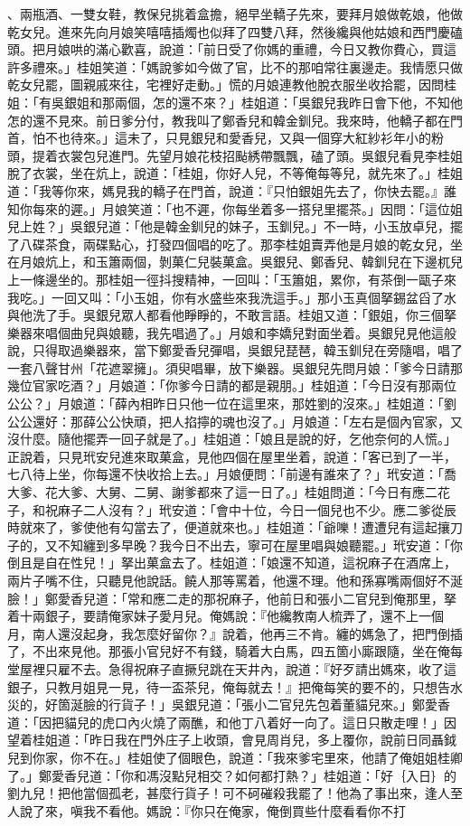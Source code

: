、兩瓶酒、一雙女鞋，教保兒挑着盒擔，絕早坐轎子先來，要拜月娘做乾娘，他做乾女兒。進來先向月娘笑嘻嘻插燭也似拜了四雙八拜，然後纔與他姑娘和西門慶磕頭。把月娘哄的滿心歡喜，說道：「前日受了你媽的重禮，今日又教你費心，買這許多禮來。」桂姐笑道：「媽說爹如今做了官，比不的那咱常往裏邊走。我情愿只做乾女兒罷，圖親戚來往，宅裡好走動。」慌的月娘連教他脫衣服坐收拾罷，因問桂姐：「有吳銀姐和那兩個，怎的還不來？」桂姐道：「吳銀兒我昨日會下他，不知他怎的還不見來。前日爹分付，教我叫了鄭香兒和韓金釧兒。我來時，他轎子都在門首，怕不也待來。」這未了，只見銀兒和愛香兒，又與一個穿大紅紗衫年小的粉頭，提着衣裳包兒進門。先望月娘花枝招颭綉帶飄飄，磕了頭。吳銀兒看見李桂姐脫了衣裳，坐在炕上，說道：「桂姐，你好人兒，不等俺每等兒，就先來了。」桂姐道：「我等你來，媽見我的轎子在門首，說道：『只怕銀姐先去了，你快去罷。』誰知你每來的遲。」月娘笑道：「也不遲，你每坐着多一搭兒里擺茶。」因問：「這位姐兒上姓？」吳銀兒道：「他是韓金釧兒的妹子，玉釧兒。」不一時，小玉放卓兒，擺了八碟茶食，兩碟點心，打發四個唱的吃了。那李桂姐賣弄他是月娘的乾女兒，坐在月娘炕上，和玉簫兩個，剝菓仁兒裝菓盒。吳銀兒、鄭香兒、韓釧兒在下邊杌兒上一條邊坐的。那桂姐一徑抖搜精神，一回叫：「玉簫姐，累你，有茶倒一甌子來我吃。」一回又叫：「小玉姐，你有水盛些來我洗這手。」那小玉真個拏錫盆舀了水與他洗了手。吳銀兒眾人都看他睜睜的，不敢言語。桂姐又道：「銀姐，你三個拏樂器來唱個曲兒與娘聽，我先唱過了。」月娘和李嬌兒對面坐着。吳銀兒見他這般說，只得取過樂器來，當下鄭愛香兒彈唱，吳銀兒琵琶，韓玉釧兒在旁隨唱，唱了一套八聲甘州「花遮翠擁」。須臾唱畢，放下樂器。吳銀兒先問月娘：「爹今日請那幾位官家吃酒？」月娘道：「你爹今日請的都是親朋。」桂姐道：「今日沒有那兩位公公？」月娘道：「薛內相昨日只他一位在這里來，那姓劉的沒來。」桂姐道：「劉公公還好：那薛公公快頑，把人掐擰的魂也沒了。」月娘道：「左右是個內官家，又沒什麼。隨他擺弄一回子就是了。」桂姐道：「娘且是說的好，乞他奈何的人慌。」正說着，只見玳安兒進來取菓盒，見他四個在屋里坐着，說道：「客已到了一半，七八待上坐，你每還不快收拾上去。」月娘便問：「前邊有誰來了？」玳安道：「喬大爹、花大爹、大舅、二舅、謝爹都來了這一日了。」桂姐問道：「今日有應二花子，和祝麻子二人沒有？」玳安道：「會中十位，今日一個兒也不少。應二爹從辰時就來了，爹使他有勾當去了，便道就來也。」桂姐道：「爺嚛！遭遭兒有這起攘刀子的，又不知纏到多早晚？我今日不出去，寧可在屋里唱與娘聽罷。」玳安道：「你倒且是自在性兒！」拏出菓盒去了。桂姐道：「娘還不知道，這祝麻子在酒席上，兩片子嘴不住，只聽見他說話。饒人那等罵着，他還不理。他和孫寡嘴兩個好不涎臉！」鄭愛香兒道：「常和應二走的那祝麻子，他前日和張小二官兒到俺那里，拏着十兩銀子，要請俺家妹子愛月兒。俺媽說：『他纔教南人梳弄了，還不上一個月，南人還沒起身，我怎麼好留你？』說着，他再三不肯。纏的媽急了，把門倒插了，不出來見他。那張小官兒好不有錢，騎着大白馬，四五箇小廝跟隨，坐在俺每堂屋裡只雇不去。急得祝麻子直撅兒跳在天井內，說道：『好歹請出媽來，收了這銀子，只教月姐見一見，待一盃茶兒，俺每就去！』把俺每笑的要不的，只想告水災的，好箇涎臉的行貨子！」吳銀兒道：「張小二官兒先包着董貓兒來。」鄭愛香道：「因把貓兒的虎口內火燒了兩醮，和他丁八着好一向了。這日只散走哩！」因望着桂姐道：「昨日我在門外庄子上收頭，會見周肖兒，多上覆你，說前日同聶鉞兒到你家，你不在。」桂姐使了個眼色，說道：「我來爹宅里來，他請了俺姐姐桂卿了。」鄭愛香兒道：「你和馮沒點兒相交？如何都打熱？」桂姐道：「好｛入日｝的劉九兒！把他當個孤老，甚麼行貨子！可不砢磪殺我罷了！他為了事出來，逢人至人說了來，嗔我不看他。媽說：『你只在俺家，俺倒買些什麼看看你不打